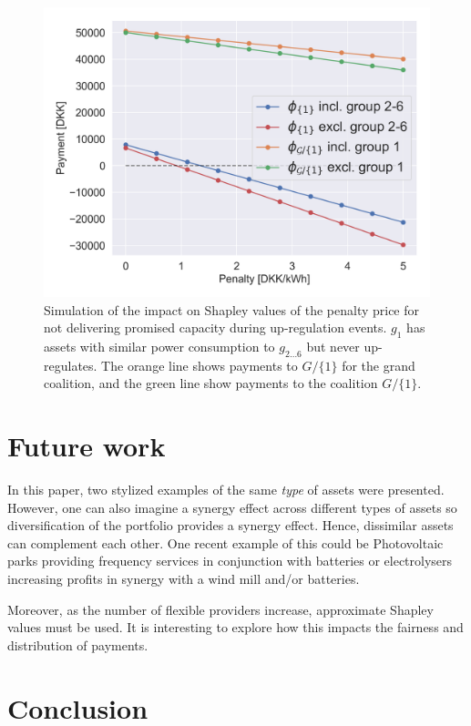 \documentclass[lettersize,journal]{IEEEtran}
\begin{document}
\begin{figure}[!t]
    \centering
    \includegraphics[width=\columnwidth]{figures/shapley_values.png}
    \caption{Simulation of the impact on Shapley values of the penalty price for not delivering promised capacity during up-regulation events. $g_1$ has assets with similar power consumption to $g_{2\hdots 6}$ but never up-regulates. The orange line shows payments to $G / \{1\}$ for the grand coalition, and the green line show payments to the coalition $G / \{1\}$.}
    \label{fig:shapley_values}
\end{figure}

\section{Future work}

In this paper, two stylized examples of the same \textit{type} of assets were presented. However, one can also imagine a synergy effect across different types of assets so diversification of the portfolio provides a synergy effect. Hence, dissimilar assets can complement each other. One recent example of this could be Photovoltaic parks providing frequency services in conjunction with batteries or electrolysers increasing profits in synergy with a wind mill and/or batteries.

Moreover, as the number of flexible providers increase, approximate Shapley values must be used. It is interesting to explore how this impacts the fairness and distribution of payments.

\section{Conclusion}




% 



\vfill
\end{document}
